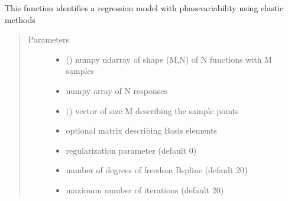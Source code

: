 \documentclass[letterpaper,10pt,english]{sphinxmanual}
\begin{document}

\begin{fulllineitems}
\label{\detokenize{regression:regression.elastic_regression}}
This function identifies a regression model with phase\sphinxhyphen{}variability
using elastic methods
\begin{quote}\begin{description}
\item[{Parameters}] \leavevmode\begin{itemize}
\item {} 
 () \textendash{} numpy ndarray of shape (M,N) of N functions with M samples

\item {} 
 \textendash{} numpy array of N responses

\item {} 
 () \textendash{} vector of size M describing the sample points

\item {} 
 \textendash{} optional matrix describing Basis elements

\item {} 
 \textendash{} regularization parameter (default 0)

\item {} 
 \textendash{} number of degrees of freedom B\sphinxhyphen{}spline (default 20)

\item {} 
 \textendash{} maximum number of iterations (default 20)


\end{itemize}
\end{description}
\end{quote}
\end{fulllineitems}
\end{document}
